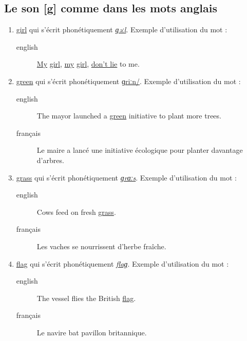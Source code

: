 \subsection{Le son [g] comme dans les mots anglais}
\label{sec:orgf88a6b3}
\begin{enumerate}
\item \href{http://www.wordreference.com/enfr/girl}{girl} qui s'écrit phonétiquement \href{https://en.oxforddictionaries.com/definition/girl}{\emph{ɡəːl}}. Exemple d'utilisation du mot :
\begin{description}
\item[{english}] \textenglish{\href{https://en.wikipedia.org/wiki/In\_the\_Pines}{My}
\href{https://youtu.be/bpFuH8vcXbw}{girl},
\href{https://genius.com/Nirvana-where-did-you-sleep-last-night-lyrics}{my}
\href{https://youtu.be/PsfcUZBMSSg}{girl},
\href{https://fr.wikipedia.org/wiki/Where\_Did\_You\_Sleep\_Last\_Night}{don't
lie} to me.}
\end{description}
\item \href{http://www.wordreference.com/enfr/green}{green} qui s'écrit phonétiquement \href{https://en.oxforddictionaries.com/definition/green}{ɡriːn/}. Exemple d'utilisation du mot :
\begin{description}
\item[{english}] \textenglish{The mayor launched a \href{https://youtu.be/a1BS7XnEZqc}{green} initiative to plant more
trees.}
\item[{français}] Le maire a lancé une initiative écologique pour
planter davantage d'arbres.
\end{description}
\item \href{http://www.wordreference.com/enfr/grass}{grass} qui s'écrit phonétiquement \href{https://en.oxforddictionaries.com/definition/grass}{\emph{ɡrɑːs}}. Exemple d'utilisation du mot :
\begin{description}
\item[{english}] \textenglish{Cows feed on fresh \href{https://youtu.be/QsfJscoMx5M}{grass}.}
\item[{français}] Les vaches se nourrissent d'herbe fraîche.
\end{description}
\item \href{http://www.wordreference.com/enfr/flag}{flag} qui s'écrit phonétiquement \href{https://en.oxforddictionaries.com/definition/flag}{\emph{flaɡ}}. Exemple d'utilisation du mot :
\begin{description}
\item[{english}] \textenglish{The vessel flies the British \href{https://youtu.be/EBl2PVjVNqA}{flag}.}
\item[{français}] Le navire bat pavillon britannique.
\end{description}
\end{enumerate}
